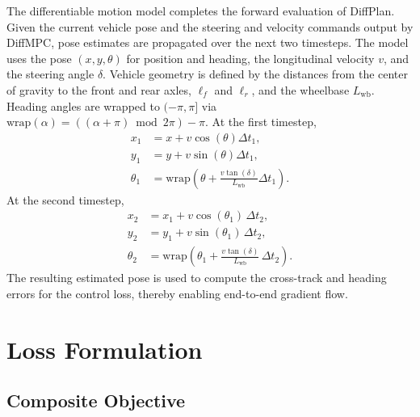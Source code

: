 The differentiable motion model completes the forward evaluation of DiffPlan.
Given the current vehicle pose and the steering and velocity commands output by DiffMPC, pose estimates are propagated over the next two timesteps.
The model uses the pose $(x, y, \theta)$ for position and heading, the longitudinal velocity $v$, and the steering angle $\delta$.
Vehicle geometry is defined by the distances from the center of gravity to the front and rear axles,
$\ell_f$ and $\ell_r $, and the wheelbase $L_{\mathrm{wb}}$.
Heading angles are wrapped to $(-\pi, \pi]$ via $\mathrm{wrap}(\alpha) = ((\alpha + \pi) \bmod 2\pi) - \pi$.
At the first timestep,
\begin{equation}
    \begin{aligned}
        x_1 &= x + v\cos(\theta)\Delta t_1, \\
        y_1 &= y + v\sin(\theta)\Delta t_1, \\
        \theta_1 &= \mathrm{wrap}\!\left(\theta + \frac{v\tan(\delta)}{L_{\mathrm{wb}}}\Delta t_1\right).
    \end{aligned}
\end{equation}
At the second timestep,
\begin{equation}
    \begin{aligned}
        x_2 &= x_1 + v\cos(\theta_1)\,\Delta t_2, \\
        y_2 &= y_1 + v\sin(\theta_1)\,\Delta t_2, \\
        \theta_2 &= \mathrm{wrap}\!\left(\theta_1 + \frac{v\tan(\delta)}{L_{\mathrm{wb}}}\,\Delta t_2\right).
    \end{aligned}
\end{equation}
The resulting estimated pose is used to compute the cross-track and heading errors for the control loss, thereby enabling end-to-end gradient flow.

\section{Loss Formulation}
\label{section:LossFormulation}

\subsection{Composite Objective}

